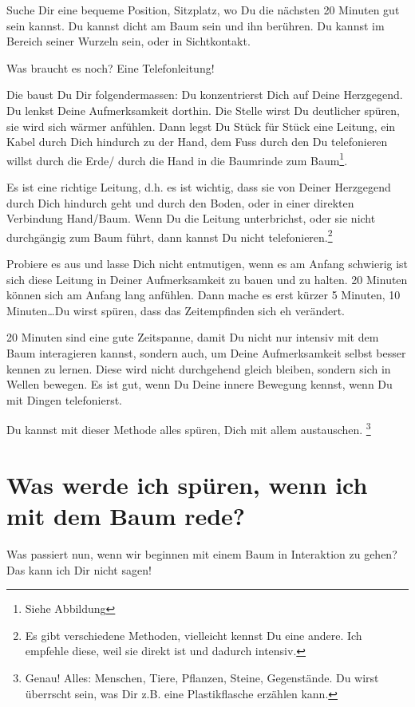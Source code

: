 \documentclass[11pt,titlepage,a5paper]{book}
\begin{document}
Suche Dir eine bequeme Position, Sitzplatz, wo Du die nächsten 20 Minuten gut sein kannst. Du kannst dicht am Baum sein und ihn berühren. Du kannst im Bereich seiner Wurzeln sein, oder in Sichtkontakt.

Was braucht es noch? Eine Telefonleitung!

Die baust Du Dir folgendermassen: Du konzentrierst Dich auf Deine Herzgegend. Du lenkst Deine Aufmerksamkeit dorthin. Die Stelle wirst Du deutlicher spüren, sie wird sich wärmer anfühlen. Dann legst Du Stück für Stück eine Leitung, ein Kabel durch Dich hindurch zu der Hand, dem Fuss durch den Du telefonieren willst durch die Erde/ durch die Hand in die Baumrinde zum Baum\footnote{Siehe Abbildung}.

Es ist eine richtige Leitung, d.h. es ist wichtig, dass sie von Deiner Herzgegend durch Dich hindurch geht und durch den Boden, oder in einer direkten Verbindung Hand/Baum. Wenn Du die Leitung unterbrichst, oder sie nicht durchgängig zum Baum führt, dann kannst Du nicht telefonieren.\footnote{Es gibt verschiedene Methoden, vielleicht kennst Du eine andere. Ich empfehle diese, weil sie direkt ist und dadurch intensiv.}

Probiere es aus und lasse Dich nicht entmutigen, wenn es am Anfang schwierig ist sich diese Leitung in Deiner Aufmerksamkeit zu bauen und zu halten. 20 Minuten können sich am Anfang lang anfühlen. Dann mache es erst kürzer 5 Minuten, 10 Minuten\dots Du wirst spüren, dass das Zeitempfinden sich eh verändert. 

20 Minuten sind eine gute Zeitspanne, damit Du nicht nur intensiv mit dem Baum interagieren kannst, sondern auch, um Deine Aufmerksamkeit selbst besser kennen zu lernen. Diese wird nicht durchgehend gleich bleiben, sondern sich in Wellen bewegen. Es ist gut, wenn Du Deine innere Bewegung kennst, wenn Du mit Dingen telefonierst.

Du kannst mit dieser Methode alles spüren, Dich mit allem austauschen. \footnote{Genau! Alles: Menschen, Tiere, Pflanzen, Steine, Gegenstände. Du wirst überrscht sein, was Dir z.B. eine Plastikflasche erzählen kann.}


\section{Was werde ich spüren, wenn ich mit dem Baum rede?}

Was passiert nun, wenn wir beginnen mit einem Baum in Interaktion zu gehen? Das kann ich Dir nicht sagen!
\end{document}
